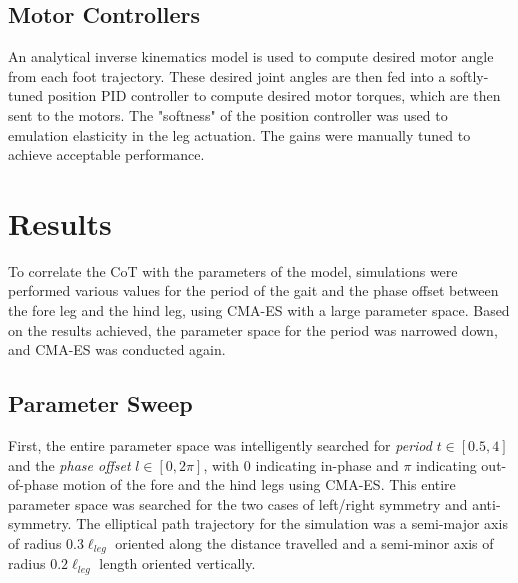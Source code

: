 \documentclass[conference,11pt,letterpaper]{IEEEtran}
\begin{document}
\subsection{Motor Controllers}
An analytical inverse kinematics model is used to compute desired motor angle from each foot trajectory. These desired joint angles are then fed into a softly-tuned position PID controller to compute desired motor torques, which are then sent to the motors. The "softness" of the position controller was used to emulation elasticity in the leg actuation. The gains were manually tuned to achieve acceptable performance. 

\section{Results}

To correlate the CoT with the parameters of the model, simulations were performed various values for the period of the gait and the phase offset between the fore leg and the hind leg, using CMA-ES with a large parameter space. Based on the results achieved, the parameter space for the period was narrowed down, and CMA-ES was conducted again.

\subsection{Parameter Sweep}
First, the entire parameter space was intelligently searched for \emph{period} $t \in[0.5,4]$ and the \emph{phase offset} $l \in[0,2\pi]$, with $0$ indicating in-phase and $\pi$ indicating out-of-phase motion of the fore and the hind legs using CMA-ES. This entire parameter space was searched for the two cases of left/right symmetry and anti-symmetry. The elliptical path trajectory for the simulation was a semi-major axis of radius $0.3\ell_{leg}$ oriented along the distance travelled and a semi-minor axis of radius $0.2\ell_{leg}$ length oriented vertically. 
\end{document}
